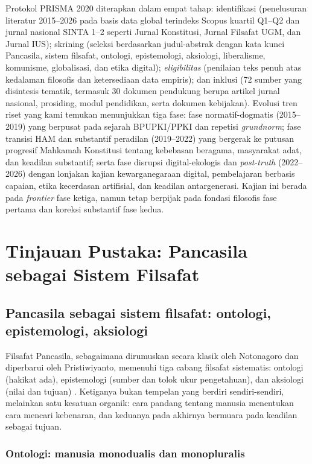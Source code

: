 \documentclass[journal]{IEEEtran}
\begin{document}
Protokol PRISMA 2020 diterapkan dalam empat tahap: identifikasi (penelusuran literatur 2015--2026 pada basis data global terindeks Scopus kuartil Q1--Q2 dan jurnal nasional SINTA 1--2 seperti Jurnal Konstitusi, Jurnal Filsafat UGM, dan Jurnal IUS); skrining (seleksi berdasarkan judul-abstrak dengan kata kunci Pancasila, sistem filsafat, ontologi, epistemologi, aksiologi, liberalisme, komunisme, globalisasi, dan etika digital); \textit{eligibilitas} (penilaian teks penuh atas kedalaman filosofis dan ketersediaan data empiris); dan inklusi (72 sumber yang disintesis tematik, termasuk 30 dokumen pendukung berupa artikel jurnal nasional, prosiding, modul pendidikan, serta dokumen kebijakan). Evolusi tren riset yang kami temukan menunjukkan tiga fase: fase normatif-dogmatis (2015--2019) yang berpusat pada sejarah BPUPKI/PPKI dan repetisi \textit{grundnorm}; fase transisi HAM dan substantif peradilan (2019--2022) yang bergerak ke putusan progresif Mahkamah Konstitusi tentang kebebasan beragama, masyarakat adat, dan keadilan substantif; serta fase disrupsi digital-ekologis dan \textit{post-truth} (2022--2026) dengan lonjakan kajian kewarganegaraan digital, pembelajaran berbasis capaian, etika kecerdasan artifisial, dan keadilan antargenerasi. Kajian ini berada pada \textit{frontier} fase ketiga, namun tetap berpijak pada fondasi filosofis fase pertama dan koreksi substantif fase kedua.

\section{Tinjauan Pustaka: Pancasila sebagai Sistem Filsafat}

\subsection{Pancasila sebagai sistem filsafat: ontologi, epistemologi, aksiologi}

Filsafat Pancasila, sebagaimana dirumuskan secara klasik oleh Notonagoro dan diperbarui oleh Pristiwiyanto, memenuhi tiga cabang filsafat sistematis: ontologi (hakikat ada), epistemologi (sumber dan tolok ukur pengetahuan), dan aksiologi (nilai dan tujuan) \cite{notonagoro1975,pristiwiyanto2021}. Ketiganya bukan tempelan yang berdiri sendiri-sendiri, melainkan satu kesatuan organik: cara pandang tentang manusia menentukan cara mencari kebenaran, dan keduanya pada akhirnya bermuara pada keadilan sebagai tujuan.

\subsubsection{Ontologi: manusia monodualis dan monopluralis}
\end{document}
